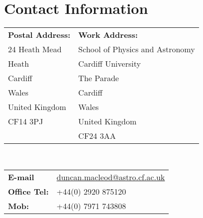 \section{Contact Information}
\begin{tabular}{@{}p{50mm} p{50mm}}
\textbf{Postal Address:} & \textbf{Work Address:} \\
24 Heath Mead & School of Physics and Astronomy\\
Heath & Cardiff University\\
Cardiff & The Parade\\
Wales & Cardiff \\
United Kingdom & Wales\\
CF14 3PJ & United Kingdom\\
& CF24 3AA
\end{tabular}\\
\begin{tabular}{@{}ll}
\textbf{E-mail} & \href{mailto:duncan.macleod@astro.cf.ac.uk}{duncan.macleod@astro.cf.ac.uk}\\
\textbf{Office Tel:} & +44(0) 2920 875120\\
\textbf{Mob:} & +44(0) 7971 743808
\end{tabular}
